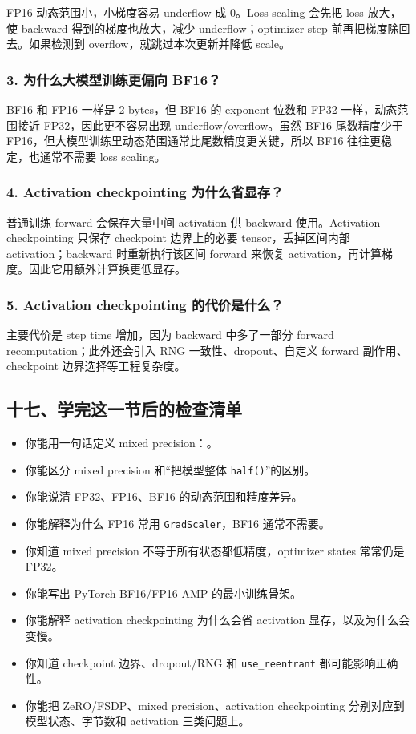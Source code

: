 FP16 动态范围小，小梯度容易 underflow 成 0。Loss scaling 会先把 loss 放大，使 backward 得到的梯度也放大，减少 underflow；optimizer step 前再把梯度除回去。如果检测到 overflow，就跳过本次更新并降低 scale。

\subsubsection*{3. 为什么大模型训练更偏向 BF16？}

BF16 和 FP16 一样是 2 bytes，但 BF16 的 exponent 位数和 FP32 一样，动态范围接近 FP32，因此更不容易出现 underflow/overflow。虽然 BF16 尾数精度少于 FP16，但大模型训练里动态范围通常比尾数精度更关键，所以 BF16 往往更稳定，也通常不需要 loss scaling。

\subsubsection*{4. Activation checkpointing 为什么省显存？}

普通训练 forward 会保存大量中间 activation 供 backward 使用。Activation checkpointing 只保存 checkpoint 边界上的必要 tensor，丢掉区间内部 activation；backward 时重新执行该区间 forward 来恢复 activation，再计算梯度。因此它用额外计算换更低显存。

\subsubsection*{5. Activation checkpointing 的代价是什么？}

主要代价是 step time 增加，因为 backward 中多了一部分 forward recomputation；此外还会引入 RNG 一致性、dropout、自定义 forward 副作用、checkpoint 边界选择等工程复杂度。

\subsection{十七、学完这一节后的检查清单}

\begin{itemize}[leftmargin=1.5em]
  \item 你能用一句话定义 mixed precision：。
  \item 你能区分 mixed precision 和“把模型整体 \texttt{half()}”的区别。
  \item 你能说清 FP32、FP16、BF16 的动态范围和精度差异。
  \item 你能解释为什么 FP16 常用 \texttt{GradScaler}，BF16 通常不需要。
  \item 你知道 mixed precision 不等于所有状态都低精度，optimizer states 常常仍是 FP32。
  \item 你能写出 PyTorch BF16/FP16 AMP 的最小训练骨架。
  \item 你能解释 activation checkpointing 为什么会省 activation 显存，以及为什么会变慢。
  \item 你知道 checkpoint 边界、dropout/RNG 和 \texttt{use\_reentrant} 都可能影响正确性。
  \item 你能把 ZeRO/FSDP、mixed precision、activation checkpointing 分别对应到模型状态、字节数和 activation 三类问题上。
\end{itemize}

